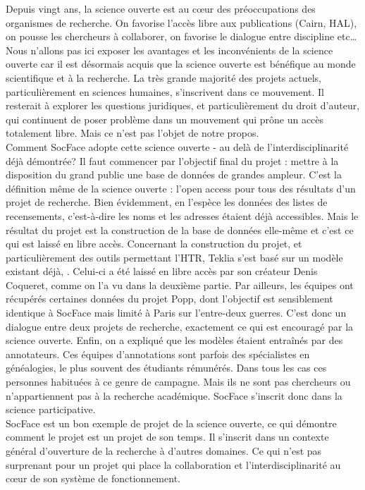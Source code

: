 Depuis vingt ans, la science ouverte est au cœur des préoccupations des organismes de recherche. On favorise l’accès libre aux publications (Cairn, HAL), on pousse les chercheurs à collaborer, on favorise le dialogue entre discipline etc… Nous n’allons pas ici exposer les avantages et les inconvénients de la science ouverte car il est désormais acquis que la science ouverte est bénéfique au monde scientifique et à la recherche. La très grande majorité des projets actuels, particulièrement en sciences humaines, s’inscrivent dans ce mouvement. Il resterait à explorer les questions juridiques, et particulièrement du droit d’auteur, qui continuent de poser problème dans un mouvement qui prône un accès totalement libre. Mais ce n’est pas l’objet de notre propos. \\
Comment SocFace adopte cette science ouverte - au delà de l'interdisciplinarité déjà démontrée?  Il faut commencer par l’objectif final du projet : mettre à la disposition du grand public une base de données de grandes ampleur. C’est la définition même de la science ouverte : l’open access pour tous des résultats d’un projet de recherche. Bien évidemment, en l’espèce les données des listes de recensements, c’est-à-dire les noms et les adresses étaient déjà accessibles. Mais le résultat du projet est la construction de la base de données elle-même et c’est ce qui est laissé en libre accès. Concernant la construction du projet, et particulièrement des outils permettant l’HTR, Teklia s’est basé sur un modèle existant déjà, \DAN{}. Celui-ci a été laissé en libre accès par son créateur Denis Coqueret, comme on l’a vu dans la deuxième partie. Par ailleurs, les équipes ont récupérés certaines données du projet Popp, dont l’objectif est sensiblement identique à SocFace mais limité à Paris sur l’entre-deux guerres. C’est donc un dialogue entre deux projets de recherche, exactement ce qui est encouragé par la science ouverte. Enfin, on a expliqué que les modèles étaient entraînés par des annotateurs. Ces équipes d’annotations sont parfois des spécialistes en généalogies, le plus souvent des étudiants rémunérés. Dans tous les cas ces personnes habituées à ce genre de campagne. Mais ils ne sont pas chercheurs ou n’appartiennent pas à la recherche académique. SocFace s’inscrit donc dans la science participative.\\

SocFace est un bon exemple de projet de la science ouverte, ce qui démontre comment le projet est un projet de son temps. Il s’inscrit dans un contexte général d’ouverture de la recherche à d’autres domaines. Ce qui n’est pas surprenant pour un projet qui place la collaboration et l’interdisciplinarité au cœur de son système de fonctionnement. 

